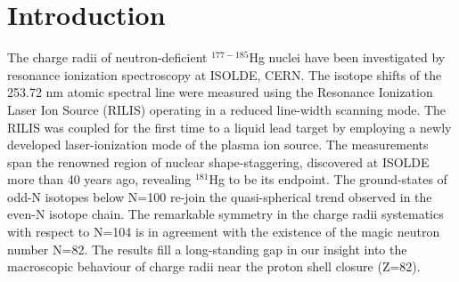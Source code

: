 \section{Introduction}
The charge radii of neutron-deficient $^{177-185}$Hg nuclei have been investigated by resonance ionization spectroscopy at ISOLDE, CERN.  The isotope shifts of the 253.72 nm atomic spectral line were measured using the Resonance Ionization Laser Ion Source (RILIS) operating in a reduced line-width scanning mode.  The RILIS was coupled for the first time to a liquid lead target by employing a newly developed laser-ionization mode of the plasma ion source. The measurements span the renowned region of nuclear shape-staggering, discovered at ISOLDE more than 40 years ago, revealing $^{181}$Hg to be its endpoint. The ground-states of odd-N isotopes below N=100 re-join the quasi-spherical trend observed in the even-N isotope chain.  The remarkable symmetry in the charge radii systematics with respect to N=104 is in agreement with the existence of the magic neutron number N=82. The results fill a long-standing gap in our insight into the macroscopic behaviour of charge radii near the proton shell closure (Z=82).